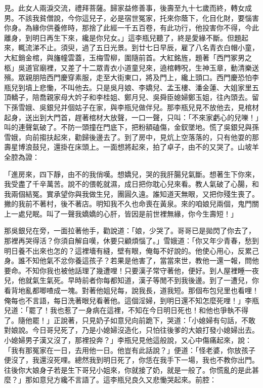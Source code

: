 \begin{showcontents}{}
見。此女人兩淚交流，禮拜菩薩。歸家益修善事，後壽至九十七歲而終，轉女成男。不該我貧僧說，今你這兒子，必是宿世冤家，托來你蔭下，化目化財，要惱害你身。為緣你供養修時，那捨了此經一千五百卷，有此功行，他投害你不得，今此離身，到明日再生下來，纔是你兒女。」這李瓶兒聽了，終是愛緣不斷。但題起來，輒流涕不止。須臾，過了五日光景。到廿七日早辰，雇了八名青衣白帽小童，大紅銷金棺，與旛幢雲蓋，玉梅雪柳，圍隨前首。大紅銘旌，題著「西門冢男之柩」吳道官廟裡，又差了十二眾青衣小道童兒來，遶棺轉呪，生神玉章，動清樂送殯。眾親朋陪西門慶穿素服，走至大街東口，將及門上，纔上頭口。西門慶恐怕李瓶兒到墳上悲慟，不叫他去。只是吳月娘、李嬌兒、孟玉樓、潘金蓮、大姐家里五頂轎子，陪喬親家母大妗子和李桂姐、鄭月兒、吳舜臣媳婦鄭玉姐，往內頭去。留下孫雪娥、吳銀兒并個姑子在家，與李瓶兒做伴兒。那李瓶兒見不放他去，見棺材起身，送出到大門首，趕著棺材大放聲，一口一聲，只叫：「不來家虧心的兒嚛！」叫的連聲氣破了。不防一頭撞在門底下，把粉額磕傷，金釵墜地。慌了吳銀兒與孫雪娥，向前搊扶起來，勸歸後邊去了。到了房中，見炕上空落落的，只有他耍的那壽星博浪鼓兒，還掛在床頭上。一面想將起來，拍了卓子，由不的又哭了。山坡羊全腔為證：

「進房來，四下靜，由不的我俏嘆。想嬌兒，哭的我肝腸兒氣斷。想著生下你來，我受盡了千辛萬苦。說不的偎乾就濕，成日把你耽心兒來看。教人氣破了心腸，和我兩個結冤。實承望你與我做生兒，團圓久遠。誰知道天無眼，又把你殘生喪了。撇的我前不著村，後不著店。明知我不久也命喪在黃泉。來的咱娘兒兩個，鬼門關上一處兒眠。叫了一聲我嬌嬌的心肝，皆因是前世裡無緣，你今生壽短！」

那吳銀兒在旁，一面拉著他手，勸說道：「娘，少哭了。哥哥已是拋閃了你去了，那裡再哭得活？你須自解自嘆，休要只顧煩惱了。」雪娥道：「你又年少青春，愁到明日養不出來也怎的？這裡墻有縫，壁有眼，俺每不好說的。他使心用心，反累己身。誰不知他氣不忿你養這孩子？若果是他害了，當當來世，教他一還一報，問他要命。不知你我也被他話理了幾遭哩！只要漢子常守著他，便好。到人屋裡睡一夜兒，他就氣生氣死。早時前者你每都知道，漢子等閒不到我後邊。到了一遭兒，你看背地亂都唧喳成一塊。對著他姐兒每，說我長，道我短。那個布包兒里也看哩！俺每也不言語，每日洗著眼兒看著他。這個淫婦，到明日還不知怎麼死哩！」李瓶兒道：「罷了！我也惹了一身病在這裡，不知在今日明日死也！和他也爭執不得了。隨他罷！」正說著，只見奶子如意兒向前跪下，哭道：「小媳婦有句話，不敢對娘說。今日哥兒死了，乃是小媳婦沒造化，只怕往後爹的大娘打發小媳婦出去。小媳婦男子漢又沒了，那裡投奔？」李瓶兒見他這般說，又心中傷痛起來，說：「我有那冤家在一日，去用他一日。他豈有此話說？」便道：「怪老婆，你放孩子便沒了，我還沒死哩。總然我到明日死了，你恁在我手下一場，我也不教你出門。往後你大娘身子若是生下哥兒小姐來，你就接了奶，就是一般了。你慌亂的是此甚麼？」那如意兒方纔不言語了。這李瓶兒良久又悲慟哭起來。前腔：


\end{showcontents}
